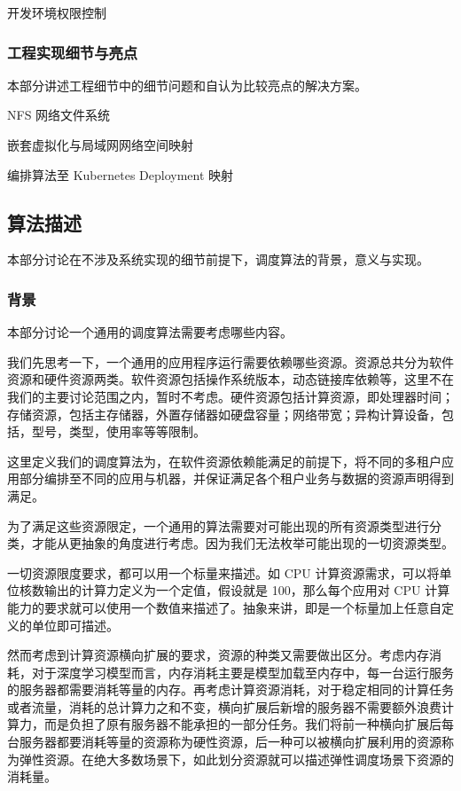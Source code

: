 开发环境权限控制

\subsubsection{工程实现细节与亮点}

本部分讲述工程细节中的细节问题和自认为比较亮点的解决方案。

NFS 网络文件系统

嵌套虚拟化与局域网网络空间映射

编排算法至 Kubernetes Deployment 映射

\subsection{算法描述}

本部分讨论在不涉及系统实现的细节前提下，调度算法的背景，意义与实现。

\subsubsection{背景}

本部分讨论一个通用的调度算法需要考虑哪些内容。

我们先思考一下，一个通用的应用程序运行需要依赖哪些资源。资源总共分为软件资源和硬件资源两类。软件资源包括操作系统版本，动态链接库依赖等，这里不在我们的主要讨论范围之内，暂时不考虑。硬件资源包括计算资源，即处理器时间；存储资源，包括主存储器，外置存储器如硬盘容量；网络带宽；异构计算设备，包括，型号，类型，使用率等等限制。

这里定义我们的调度算法为，在软件资源依赖能满足的前提下，将不同的多租户应用部分编排至不同的应用与机器，并保证满足各个租户业务与数据的资源声明得到满足。

为了满足这些资源限定，一个通用的算法需要对可能出现的所有资源类型进行分类，才能从更抽象的角度进行考虑。因为我们无法枚举可能出现的一切资源类型。

一切资源限度要求，都可以用一个标量来描述。如 CPU 计算资源需求，可以将单位核数输出的计算力定义为一个定值，假设就是 100，那么每个应用对 CPU 计算能力的要求就可以使用一个数值来描述了。抽象来讲，即是一个标量加上任意自定义的单位即可描述。

然而考虑到计算资源横向扩展的要求，资源的种类又需要做出区分。考虑内存消耗，对于深度学习模型而言，内存消耗主要是模型加载至内存中，每一台运行服务的服务器都需要消耗等量的内存。再考虑计算资源消耗，对于稳定相同的计算任务或者流量，消耗的总计算力之和不变，横向扩展后新增的服务器不需要额外浪费计算力，而是负担了原有服务器不能承担的一部分任务。我们将前一种横向扩展后每台服务器都要消耗等量的资源称为硬性资源，后一种可以被横向扩展利用的资源称为弹性资源。在绝大多数场景下，如此划分资源就可以描述弹性调度场景下资源的消耗量。

